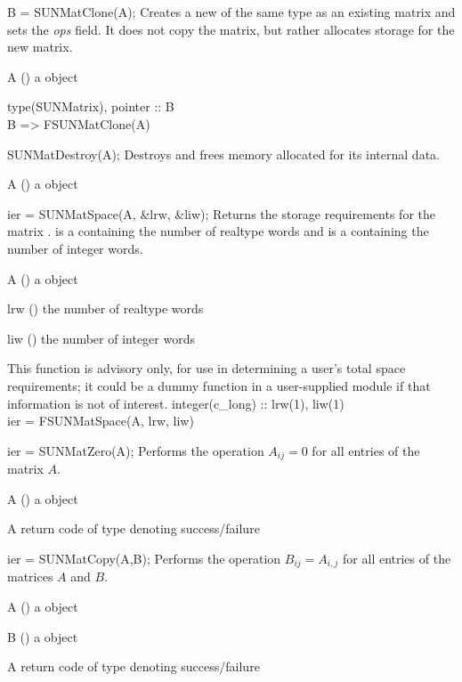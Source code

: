 {
  B = SUNMatClone(A);
}
{
  Creates a new  of the same type as an existing matrix
   and sets the {\em ops} field. It does not copy the matrix, but
  rather allocates storage for the new matrix.
}
{
  \begin{args}[c]
  \item[A] () a {\sunmatrix} object
  \end{args}
}
{
}
{}
{
  type(SUNMatrix), pointer :: B\\
  B => FSUNMatClone(A)
}

{
  SUNMatDestroy(A);
}
{
  Destroys  and frees memory allocated for its internal data.
}
{
  \begin{args}[c]
  \item[A] () a {\sunmatrix} object
  \end{args}
}
{}
{}

{
  ier = SUNMatSpace(A, \&lrw, \&liw);
}
{
  Returns the storage requirements for the matrix . 
  is a  containing the number of realtype words
  and  is a  containing the number of integer
  words.
}
{
  \begin{args}[c]
  \item[A] () a {\sunmatrix} object
  \item[lrw] () the number of realtype words
  \item[liw] () the number of integer words
  \end{args}
}
{}
{
  This function is advisory only, for use in determining a user's total
  space requirements; it could be a dummy function in a user-supplied
  {\sunmatrix} module if that information is not of interest.
}
{
  integer(c\_long) :: lrw(1), liw(1)\\
  ier = FSUNMatSpace(A, lrw, liw)
}

{
  ier = SUNMatZero(A);
}
{
  Performs the operation $A_{ij} = 0$ for all entries of the matrix $A$.
}
{
  \begin{args}[c]
  \item[A] () a {\sunmatrix} object
  \end{args}
}
{
  A {\sunmatrix} return code of type  denoting success/failure
}
{}

{
  ier = SUNMatCopy(A,B);
}
{
  Performs the operation $B_{ij} = A_{i,j}$ for all entries of the matrices
  $A$ and $B$.
}
{
  \begin{args}[c]
  \item[A] () a {\sunmatrix} object
  \item[B] () a {\sunmatrix} object
  \end{args}
}
{
  A {\sunmatrix} return code of type  denoting success/failure
}
{}

